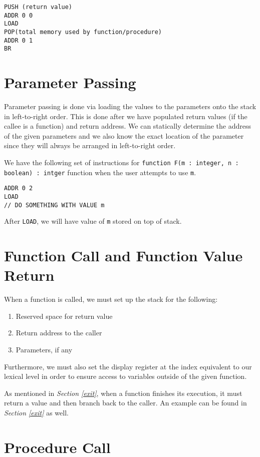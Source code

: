 \documentclass{article}
\begin{document}
\begin{lstlisting}
PUSH (return value)
ADDR 0 0
LOAD
POP(total memory used by function/procedure)
ADDR 0 1
BR
\end{lstlisting}

\section{Parameter Passing}

Parameter passing is done via loading the values to the parameters onto the stack in left-to-right order. This is done after we have populated return values (if the callee is a function) and return address. We can statically determine the address of the given parameters and we also know the exact location of the parameter since they will always be arranged in left-to-right order.

We have the following set of instructions for {\tt function F(m : integer, n : boolean) : intger} function when the user attempts to use {\tt m}.

\begin{lstlisting}
ADDR 0 2
LOAD
// DO SOMETHING WITH VALUE m
\end{lstlisting}

After {\tt LOAD}, we will have value of {\tt m} stored on top of stack.

\section{Function Call and Function Value Return}

When a function is called, we must set up the stack for the following:

\begin{enumerate}
	\item Reserved space for return value
	\item Return address to the caller
	\item Parameters, if any
\end{enumerate}

Furthermore, we must also set the display register at the index equivalent to our lexical level in order to ensure access to variables outside of the given function.

As mentioned in {\it Section \ref{exit}}, when a function finishes its execution, it must return a value and then branch back to the caller. An example can be found in {\it Section \ref{exit}} as well.

\section{Procedure Call}
\end{document}
